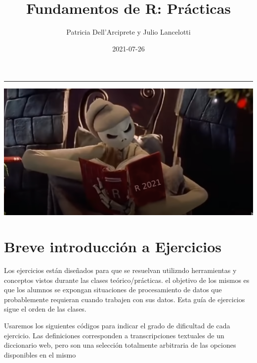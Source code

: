 \documentclass[]{book}
\title{Fundamentos de R: Prácticas}
\author{Patricia Dell'Arciprete y Julio Lancelotti}
\date{2021-07-26}
\begin{document}
\maketitle

{
\setcounter{tocdepth}{1}
\tableofcontents
}
\hypertarget{section}{%
\chapter*{}\label{section}}

\begin{center}\rule{0.5\linewidth}{0.5pt}\end{center}

\begin{center}\includegraphics[width=1\linewidth]{figuras/jackED} \end{center}

\hypertarget{breve-introducciuxf3n-a-ejercicios}{%
\chapter*{Breve introducción a Ejercicios}\label{breve-introducciuxf3n-a-ejercicios}}

Los ejercicios están diseñados para que se resuelvan utilizndo herramientas y conceptos vistos durante las clases teórico/prácticas. el objetivo de los mismos es que los alumnos se expongan situaciones de procesamiento de datos que probablemente requieran cuando trabajen con sus datos. Esta guía de ejercicios sigue el orden de las clases.

Usaremos los siguientes códigos para indicar el grado de dificultad de cada ejercicio. Las definiciones corresponden a transcripciones textuales de un diccionario web, pero son una selección totalmente arbitraria de las opciones disponibles en el mismo
\end{document}
